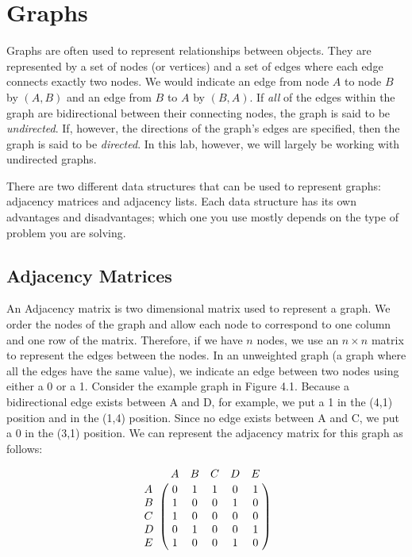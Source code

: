 \label{lab:SixDegreesKevinBacon}


\section*{Graphs}
Graphs are often used to represent relationships between objects. They are 
represented by a set of nodes (or vertices) and a set of edges where each edge
connects exactly two nodes. We would indicate an edge from node $A$ to node $B$ by $(A, B)$
and an edge from $B$ to $A$ by $(B,A)$. If \emph{all} of the edges within the graph are bidirectional 
between their connecting nodes, the graph is said to be \emph{undirected}. If, however, the directions 
of the graph's edges are specified, then the graph is said to be \emph{directed}. In this lab, however, we will largely be working
with undirected graphs.

There are two different data structures that can be used to represent graphs: adjacency matrices and adjacency lists.
Each data structure has its own advantages and disadvantages;
which one you use mostly depends on the type of problem you are solving.

\subsection*{Adjacency Matrices}
An Adjacency matrix is two dimensional matrix used to represent a graph. We order
the nodes of the graph and allow each node to correspond to one column and one
row of the matrix. Therefore, if we have $n$ nodes, we use an $n \times n$ matrix to 
represent the edges between the nodes. In an unweighted graph (a graph where all the edges have the same value), we indicate an 
edge between two nodes using either a 0 or a 1. 
Consider the example graph in Figure 4.1. Because a bidirectional edge exists between A and D, for example, we put a 1 in the (4,1) position and 
in the (1,4) position. Since no edge exists between A and C, we put a 0 in 
the (3,1) position. We can represent the adjacency matrix for this graph as follows:

\[
\bordermatrix{\hspace{.4cm}&A&B&C&D&E\cr
                A&0 & 1 & 1 & 0 & 1\cr
                B& 1 & 0 & 0 & 1 & 0\cr
                C& 1 & 0 & 0 & 0 & 0\cr
                D& 0 & 1 & 0 & 0 & 1\cr
                E& 1 & 0 & 0 & 1 & 0}\]

